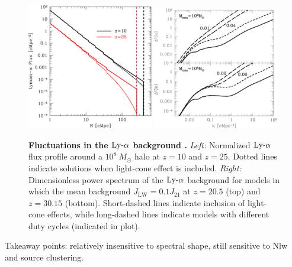 \begin{figure}[]
\begin{center}
\includegraphics[width=0.49\textwidth]{Mirocha/holzbauer2012_fig7.pdf} \includegraphics[width=0.49\textwidth]{Mirocha/holzbauer2012_fig9.pdf}
\end{center}
\caption{{\bf Fluctuations in the $\text{Ly-}\alpha$ background \cite{Holzbauer2012}.} \textit{Left:} Normalized $\text{Ly-}\alpha$ flux profile around a $10^8 \ M_{\odot}$ halo at $z=10$ and $z=25$. Dotted lines indicate solutions when light-cone effect is included. \textit{Right:} Dimensionless power spectrum of the $\text{Ly-}\alpha$ background for models in which the mean background $J_{\mathrm{LW}} = 0.1 J_{21}$ at $z=20.5$ (top) and $z=30.15$ (bottom). Short-dashed lines indicate inclusion of light-cone effects, while long-dashed lines indicate models with different duty cycles (indicated in plot).}
\label{fig:holzbauer2012}
\end{figure}

{\color{red} Takeaway points: relatively insensitive to spectral shape, still sensitive to Nlw and source clustering.}

